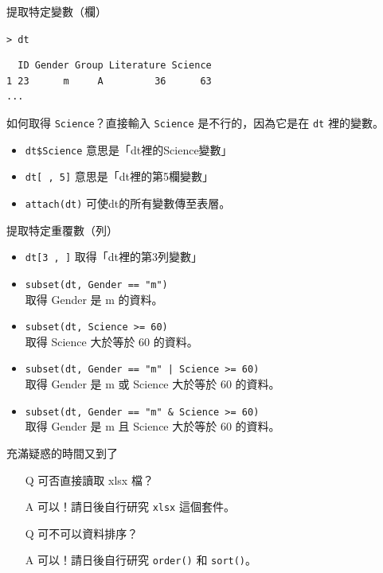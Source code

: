\documentclass[12pt]{beamer}
\begin{document}
\begin{frame}[fragile]{提取特定變數（欄）}
\begin{block}{\texttt{> dt}}
\begin{verbatim}
  ID Gender Group Literature Science
1 23      m     A         36      63
...
\end{verbatim}
\end{block}

如何取得 \texttt{Science}？直接輸入 \verb+Science+ 是不行的，因為它是在 \verb+dt+ 裡的變數。
\begin{itemize}
\item \verb+dt$Science+ 意思是「dt裡的Science變數」
\item \verb+dt[ , 5]+ 意思是「dt裡的第5欄變數」
\item \verb+attach(dt)+ 可使dt的所有變數傳至表層。
\end{itemize}
\end{frame}


\begin{frame}[fragile]{提取特定重覆數（列）}
\begin{itemize}
\item \verb+dt[3 , ]+ 取得「dt裡的第3列變數」
\item \verb+subset(dt, Gender == "m")+ \\ 取得 Gender 是 m 的資料。
\item \verb+subset(dt, Science >= 60)+ \\ 取得 Science 大於等於 60 的資料。
\item \verb+subset(dt, Gender == "m" | Science >= 60)+ \\ 取得 Gender 是 m \alert{或} Science 大於等於 60 的資料。
\item \verb+subset(dt, Gender == "m" & Science >= 60)+ \\ 取得 Gender 是 m \alert{且} Science 大於等於 60 的資料。
\end{itemize}
\end{frame}

\begin{frame}[fragile]{充滿疑惑的時間又到了}
\begin{itemize}
\item[Q] 可否直接讀取 xlsx 檔？\\
\item[A] 可以！請日後自行研究 \verb+xlsx+ 這個套件。
\item [ ] \pause
\item[Q] 可不可以資料排序？\\
\item[A] 可以！請日後自行研究 \verb+order()+ 和 \verb+sort()+。
\end{itemize}
\end{frame}
\end{document}
